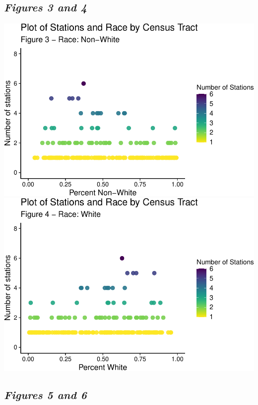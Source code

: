 \documentclass[
  12pt,
]{article}
\begin{document}
\begin{longtable}[]
\hypertarget{figures-3-and-4}{%
\subsection{\texorpdfstring{\emph{Figures 3 and
4}}{Figures 3 and 4}}\label{figures-3-and-4}}

\includegraphics{Project_Template_files/figure-latex/data scatterplots prnnwht-1.pdf}
\includegraphics{Project_Template_files/figure-latex/data scatterplots prnnwht-2.pdf}

\hypertarget{figures-5-and-6}{%
\subsection{\texorpdfstring{\emph{Figures 5 and
6}}{Figures 5 and 6}}\label{figures-5-and-6}}


\end{longtable}
\end{document}
